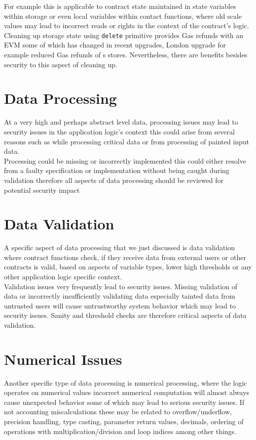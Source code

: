For example this is applicable to contract state maintained in state variables within storage or even local variables within contact functions, where old scale values may lead to incorrect reads or rights in the context of the contract's logic. Cleaning up storage state using \verb|delete| primitive provides Gas refunds with an EVM some of which has changed in recent upgrades, London upgrade for example reduced Gas refunds of s stores. Nevertheless, there are benefits besides security to this aspect of cleaning up.

\section{Data Processing}
At a very high and perhaps abstract level data, processing issues may lead to security issues in the application logic's context this could arise from several reasons such as while processing critical data or from processing of painted input data.\\

Processing could be missing or incorrectly implemented this could either resolve from a faulty specification or implementation without being caught during validation therefore all aspects of data processing should be reviewed for potential security impact

\section{Data Validation}
A specific aspect of data processing that we just discussed is data validation where contract functions check, if they receive data from external users or other contracts is valid, based on aspects of variable types, lower high thresholds or any other application logic specific context.\\

Validation issues very frequently lead to security issues. Missing validation of data or incorrectly insufficiently validating data especially tainted data from untrusted users will cause untrustworthy system behavior which may lead to security issues. Sanity and threshold checks are therefore critical aspects of data validation.

\section{Numerical Issues}
Another specific type of data processing is numerical processing, where the logic operates on numerical values incorrect numerical computation will almost always cause unexpected behavior some of which may lead to serious security issues. If not accounting miscalculations these may be related to overflow/underflow, precision handling, type casting, parameter return values, decimals, ordering of operations with multiplication/division and loop indices among other things.\\

